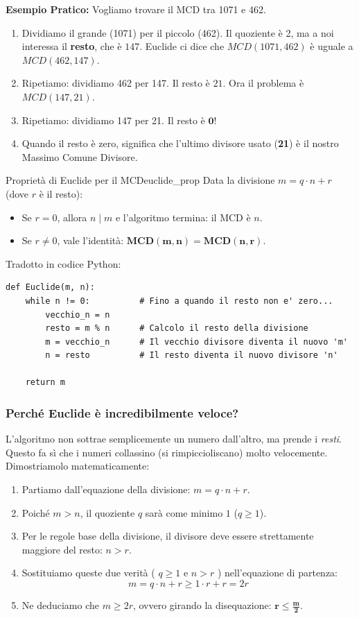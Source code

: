 \documentclass[openany,a4paper,12pt]{book}
\begin{document}
\textbf{Esempio Pratico:}
Vogliamo trovare il MCD tra 1071 e 462.
\begin{enumerate}
    \item Dividiamo il grande (1071) per il piccolo (462). Il quoziente è 2, ma a noi interessa il \textbf{resto}, che è $147$. Euclide ci dice che $MCD(1071, 462)$ è uguale a $MCD(462, 147)$. 
    \item Ripetiamo: dividiamo 462 per 147. Il resto è $21$. Ora il problema è $MCD(147, 21)$.
    \item Ripetiamo: dividiamo 147 per 21. Il resto è $\mathbf{0}$! 
    \item Quando il resto è zero, significa che l'ultimo divisore usato (\textbf{21}) è il nostro Massimo Comune Divisore.
\end{enumerate}

\begin{teorema}{Proprietà di Euclide per il MCD}{euclide_prop}
Data la divisione $m = q \cdot n + r$ (dove $r$ è il resto):
\begin{itemize}
    \item Se $r = 0$, allora $n \mid m$ e l'algoritmo termina: il MCD è $n$.
    \item Se $r \neq 0$, vale l'identità: $\mathbf{MCD(m, n) = MCD(n, r)}$.
\end{itemize}
\end{teorema}

Tradotto in codice Python:

\begin{lstlisting}
def Euclide(m, n): 
    while n != 0:          # Fino a quando il resto non e' zero...
        vecchio_n = n      
        resto = m % n      # Calcolo il resto della divisione
        m = vecchio_n      # Il vecchio divisore diventa il nuovo 'm'
        n = resto          # Il resto diventa il nuovo divisore 'n'
        
    return m
\end{lstlisting}

\subsubsection*{Perché Euclide è incredibilmente veloce?}
L'algoritmo non sottrae semplicemente un numero dall'altro, ma prende i \textit{resti}. Questo fa sì che i numeri collassino (si rimpiccioliscano) molto velocemente. Dimostriamolo matematicamente:

\begin{enumerate}
    \item Partiamo dall'equazione della divisione: $m = q \cdot n + r$.
    \item Poiché $m > n$, il quoziente $q$ sarà come minimo $1$ ($q \ge 1$).
    \item Per le regole base della divisione, il divisore deve essere strettamente maggiore del resto: $n > r$.
    \item Sostituiamo queste due verità ( $q \ge 1$ e $n > r$ ) nell'equazione di partenza:
    \[ m = q \cdot n + r \ge 1 \cdot r + r = 2r \]
    \item Ne deduciamo che $m \ge 2r$, ovvero girando la disequazione: $\mathbf{r \le \frac{m}{2}}$.
\end{enumerate}
\end{document}
